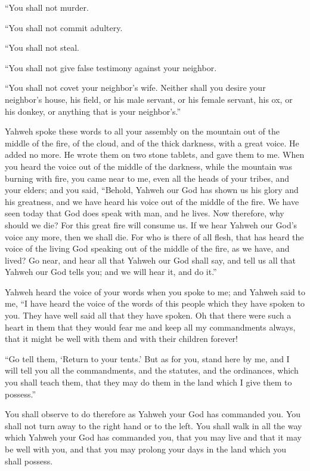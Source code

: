 {\par }{\PP {}“You shall not murder.
\par }{\PP {}“You shall not commit adultery.
\par }{\PP {}“You shall not steal.
\par }{\PP {}“You shall not give false testimony against your neighbor.
\par }{\PP {}“You shall not covet your neighbor’s wife. Neither shall you desire your neighbor’s house, his field, or his male servant, or his female servant, his ox, or his donkey, or anything that is your neighbor’s.”
\par }{\PP {}Yahweh spoke these words to all your assembly on the mountain out of the middle of the fire, of the cloud, and of the thick darkness, with a great voice. He added no more. He wrote them on two stone tablets, and gave them to me.
When you heard the voice out of the middle of the darkness, while the mountain was burning with fire, you came near to me, even all the heads of your tribes, and your elders;
and you said, “Behold, Yahweh our God has shown us his glory and his greatness, and we have heard his voice out of the middle of the fire. We have seen today that God does speak with man, and he lives.
Now therefore, why should we die? For this great fire will consume us. If we hear Yahweh our God’s voice any more, then we shall die.
For who is there of all flesh, that has heard the voice of the living God speaking out of the middle of the fire, as we have, and lived?
Go near, and hear all that Yahweh our God shall say, and tell us all that Yahweh our God tells you; and we will hear it, and do it.”
\par }{\PP {}Yahweh heard the voice of your words when you spoke to me; and Yahweh said to me, “I have heard the voice of the words of this people which they have spoken to you. They have well said all that they have spoken.
Oh that there were such a heart in them that they would fear me and keep all my commandments always, that it might be well with them and with their children forever!
\par }{\PP {}“Go tell them, ‘Return to your tents.’
But as for you, stand here by me, and I will tell you all the commandments, and the statutes, and the ordinances, which you shall teach them, that they may do them in the land which I give them to possess.”
\par }{\PP {}You shall observe to do therefore as Yahweh your God has commanded you. You shall not turn away to the right hand or to the left.
You shall walk in all the way which Yahweh your God has commanded you, that you may live and that it may be well with you, and that you may prolong your days in the land which you shall possess.

}

